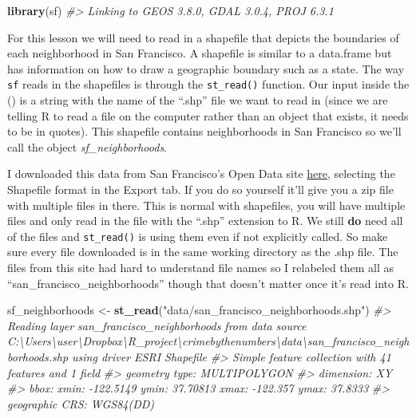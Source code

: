\documentclass[
  12pt,
]{book}
\newenvironment{Shaded}{\begin{snugshade}}{\end{snugshade}}
\newcommand{\CommentTok}[1]{\textcolor[rgb]{0.37,0.37,0.37}{\textit{#1}}}
\newcommand{\KeywordTok}[1]{\textcolor[rgb]{0.27,0.27,0.27}{\textbf{#1}}}
\newcommand{\NormalTok}[1]{#1}
\newcommand{\StringTok}[1]{\textcolor[rgb]{0.5,0.5,0.5}{#1}}
\begin{document}
\begin{Shaded}
\begin{Highlighting}[]
\KeywordTok{library}\NormalTok{(sf)}
\CommentTok{\#\textgreater{} Linking to GEOS 3.8.0, GDAL 3.0.4, PROJ 6.3.1}
\end{Highlighting}
\end{Shaded}

For this lesson we will need to read in a shapefile that depicts the boundaries of each neighborhood in San Francisco. A shapefile is similar to a data.frame but has information on how to draw a geographic boundary such as a state. The way \texttt{sf} reads in the shapefiles is through the \texttt{st\_read()} function. Our input inside the () is a string with the name of the ``.shp'' file we want to read in (since we are telling R to read a file on the computer rather than an object that exists, it needs to be in quotes). This shapefile contains neighborhoods in San Francisco so we'll call the object \emph{sf\_neighborhoods}.

I downloaded this data from San Francisco's Open Data site \href{https://data.sfgov.org/Geographic-Locations-and-Boundaries/Analysis-Neighborhoods/p5b7-5n3h}{here}, selecting the Shapefile format in the Export tab. If you do so yourself it'll give you a zip file with multiple files in there. This is normal with shapefiles, you will have multiple files and only read in the file with the ``.shp'' extension to R. We still \textbf{do} need all of the files and \texttt{st\_read()} is using them even if not explicitly called. So make sure every file downloaded is in the same working directory as the .shp file. The files from this site had hard to understand file names so I relabeled them all as ``san\_francisco\_neighborhoods'' though that doesn't matter once it's read into R.

\begin{Shaded}
\begin{Highlighting}[]
\NormalTok{sf\_neighborhoods \textless{}{-}}\StringTok{ }\KeywordTok{st\_read}\NormalTok{(}\StringTok{"data/san\_francisco\_neighborhoods.shp"}\NormalTok{)}
\CommentTok{\#\textgreater{} Reading layer \textasciigrave{}san\_francisco\_neighborhoods\textquotesingle{} from data source \textasciigrave{}C:\textbackslash{}Users\textbackslash{}user\textbackslash{}Dropbox\textbackslash{}R\_project\textbackslash{}crimebythenumbers\textbackslash{}data\textbackslash{}san\_francisco\_neighborhoods.shp\textquotesingle{} using driver \textasciigrave{}ESRI Shapefile\textquotesingle{}}
\CommentTok{\#\textgreater{} Simple feature collection with 41 features and 1 field}
\CommentTok{\#\textgreater{} geometry type:  MULTIPOLYGON}
\CommentTok{\#\textgreater{} dimension:      XY}
\CommentTok{\#\textgreater{} bbox:           xmin: {-}122.5149 ymin: 37.70813 xmax: {-}122.357 ymax: 37.8333}
\CommentTok{\#\textgreater{} geographic CRS: WGS84(DD)}
\end{Highlighting}
\end{Shaded}
\end{document}
